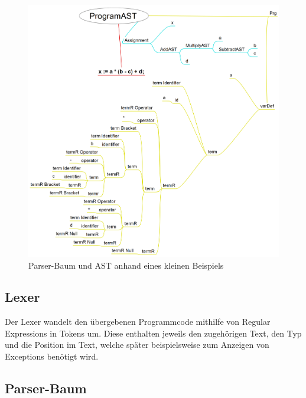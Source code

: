 \begin{figure}[tbh]
	\includegraphics[width=1.0\linewidth]{images/parser-to-ast}
	\caption[Parser-Baum und AST]{Parser-Baum und AST anhand eines kleinen Beispiels}
	\label{fig:parseast}
\end{figure}

\subsection{Lexer}

Der Lexer wandelt den übergebenen Programmcode mithilfe von Regular Expressions in Tokens um. Diese enthalten jeweils den zugehörigen Text, den Typ und die Position im Text, welche später beispielsweise zum Anzeigen von Exceptions benötigt wird. 

\subsection{Parser-Baum}\label{subsection:parser}




